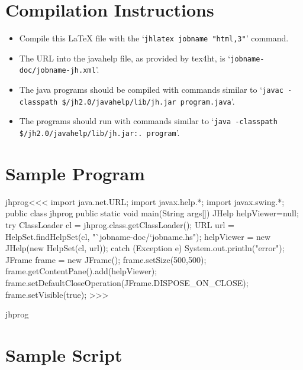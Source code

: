 ﻿\documentclass{article}
\begin{document}
\tableofcontents

\section{Compilation Instructions}

\begin{itemize}
\item
Compile this \LaTeX{} file with the
%
`{\tt jhlatex
jobname "html,3"}'
command.
\item
{}%
The URL into the javahelp file, as provided by tex4ht, is
`{\tt jobname-doc/jobname-jh.xml}'.
\item
The java programs should be compiled with commands  similar to
%
`{\tt javac -classpath
  \$/jh2.0/javahelp/lib/jh.jar program.java}'.
\item
The programs should run with commands similar to
%
`{\tt java -classpath
  \$/jh2.0/javahelp/lib/jh.jar:. program}'.
\end{itemize}




\section{Sample Program}

\<jhprog\><<<
import java.net.URL;
import javax.help.*;
import javax.swing.*;
public class jhprog {
   public static void main(String args[]) {
      JHelp helpViewer=null;
      try {
         ClassLoader cl = jhprog.class.getClassLoader();
         URL url = HelpSet.findHelpSet(cl,
                              "`jobname-doc/`jobname.hs");
         helpViewer = new JHelp(new HelpSet(cl, url));
      } catch (Exception e) { System.out.println("error");
      }
      JFrame frame = new JFrame();
      frame.setSize(500,500);
      frame.getContentPane().add(helpViewer);
      frame.setDefaultCloseOperation(JFrame.DISPOSE_ON_CLOSE);
      frame.setVisible(true);
   }
}
>>>

\OutputCode\<jhprog\>


\section{Sample Script}
\end{document}
